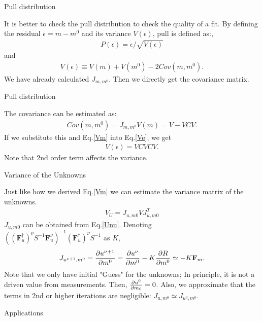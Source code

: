 \documentclass[
	xcolor=dvipsnames,
	aspectratio=169,	
	10pt, 
	]{beamer}
\begin{document}
\begin{frame}{Pull distribution}
	\begin{block}{}
		It is better to check the pull distribution to check the quality of a fit. By defining the residual $\epsilon = m-m^0$ and its variance $V(\epsilon)$, pull is defined as:, 
		\begin{align}
			P(\epsilon) = \epsilon/\sqrt{V(\epsilon)}
		\end{align}
		and
		\begin{align}
			V(\epsilon) \equiv V(m)+ V(m^0) - 2 Cov(m,m^0).\label{Ve}
		\end{align}
		We have already calculated $J_{m,m^0}$. Then we directly get the covariance matrix. 
	\end{block}
\end{frame} 
\begin{frame}{Pull distribution}
	\begin{block}{}
		The covariance can be estimated as:
		\begin{align}
			Cov(m,m^0) = J_{m,m^0}V(m) = V - VCV.
		\end{align}
		If we substitute this and Eq.\eqref{Vm} into Eq.\eqref{Ve}, we get
		\begin{align}
			V(\epsilon) = VCVCV.
		\end{align}
		Note that 2nd order term affects the variance.	
	\end{block}
\end{frame}
\begin{frame}{Variance of the Unknowns}
	\begin{block}{}
		Just like how we derived  Eq.\eqref{Vm} we can estimate the variance matrix of the unknowns. 
		\vspace{-3 mm}
		\begin{align}
			V_U = J_{u,m0} V J_{u,m0}^T
		\end{align}
		$J_{u,m0}$ can be obtained from Eq.\eqref{Unu}. Denoting\\ $((\mathbf{F}_u^\dagger)^\nu S^{-1}\mathbf F^\nu_u)^{-1}(\mathbf{F}_u^\dagger)^\nu S^{-1}$ as $K$, 
		\vspace{-3 mm}
		\begin{align}
			J_{u^{\nu+1},m^0} = \frac{\partial u^{\nu+1}}{\partial m^0} = \frac{\partial u^{\nu}}{\partial m^0} - K\frac{\partial R}{\partial m^0} \simeq -K \mathbf{F}_m.
		\end{align}
		Note that we only have initial "Guess" for the unknowns; In principle, it is not a driven value from measurements. Then, $\frac{\partial u^0}{\partial m_0} = 0$. Also, we approximate that the terms in 2nd or higher iterations are negligible: $J_{u,m^0}\simeq J_{u^0,m^0}$.
	\end{block}
\end{frame}
\begin{frame}{Applications}

\end{frame}
\end{document}
